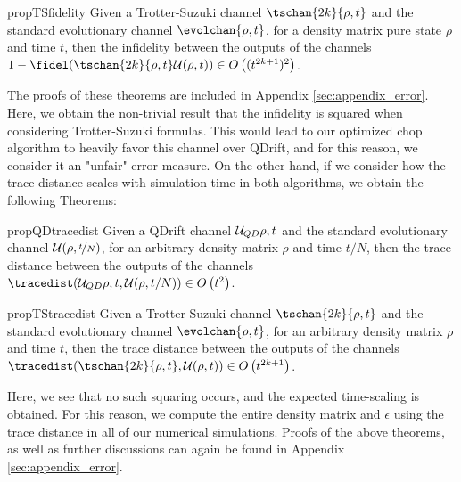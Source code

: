  \begin{restatable}{prop}{TSfidelity} \label{thm:TSfidelity}
Given a Trotter-Suzuki channel $\tschan{2k}{\rho, t}$ and the standard evolutionary channel $\evolchan{\rho, t}$, for a density matrix pure state $\rho$ and time $t$, then the infidelity between the outputs of the channels $1 - \fidel(\tschan{2k}{\rho, t} \capU(\rho, t)) \in \bigo{(t^{2k+1})^2}$.
\end{restatable}

The proofs of these theorems are included in  Appendix \ref{sec:appendix_error}. Here, we obtain the non-trivial result that the infidelity is squared when considering Trotter-Suzuki formulas. This would lead to our optimized chop algorithm to heavily favor this channel over QDrift, and for this reason, we consider it an "unfair" error measure. On the other hand, if we consider how the trace distance scales with simulation time in both algorithms, we obtain the following Theorems:

\begin{restatable}{prop}{QDtracedist} \label{thm:QDtracedist}
Given a QDrift channel $\mathcal{U}_{QD}{\rho, t}$ and the standard evolutionary channel $\mathcal{U}(\rho, \nicefrac{t}{N})$, for an arbitrary density matrix $\rho$ and time $t/N$, then the trace distance between the outputs of the channels $\tracedist(\qdchan{\rho, t}, \capU(\rho, t/N)) \in \bigo{t^2}$.
\end{restatable}

\begin{restatable}{prop}{TStracedist} \label{thm:TStracedist}
    Given a Trotter-Suzuki channel $\tschan{2k}{\rho, t}$ and the standard evolutionary channel $\evolchan{\rho, t}$, for an arbitrary density matrix $\rho$ and time $t$, then the trace distance between the outputs of the channels $\tracedist(\tschan{2k}{\rho, t}, \capU(\rho, t)) \in \bigo{t^{2k+1}}$.
\end{restatable}

Here, we see that no such squaring occurs, and the expected time-scaling is obtained. For this reason, we compute the entire density matrix and  $\epsilon$ using the trace distance in all of our numerical simulations. Proofs of the above theorems, as well as further discussions can again be found in Appendix \ref{sec:appendix_error}.

